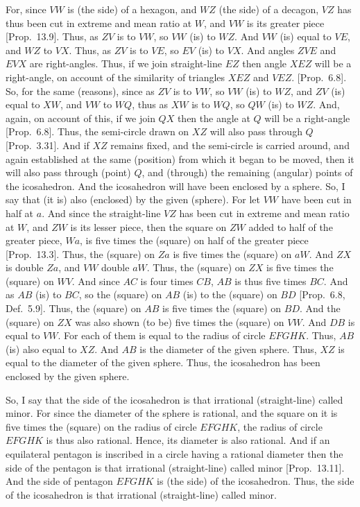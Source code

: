 For, since $VW$ is (the side) of a hexagon, and $WZ$ (the side) of
a decagon, $VZ$ has thus been cut in extreme and mean
ratio at $W$, and $VW$ is its greater piece  [Prop.~13.9]. Thus, as
$ZV$ is to $VW$, so $VW$ (is) to $WZ$. And $VW$ (is) equal
to $VE$, and $WZ$ to $VX$.  Thus, as $ZV$ is to $VE$,
so $EV$ (is) to $VX$. And angles $ZVE$ and
$EVX$ are right-angles. Thus, if we join straight-line $EZ$ then angle
$XEZ$ will be a right-angle, on account of the similarity of triangles
$XEZ$ and $VEZ$.  [Prop.~6.8]. So, for the same (reasons), since
as $ZV$ is to $VW$, so $VW$ (is) to $WZ$,  and $ZV$ (is) equal to
$XW$, and $VW$ to $WQ$, thus as $XW$ is to $WQ$, so $QW$
(is) to $WZ$. And, again, on account of this,  if we join $QX$ then the
angle at $Q$ will be a right-angle [Prop.~6.8]. Thus, the semi-circle
drawn on $XZ$ will also pass through $Q$ [Prop.~3.31]. And if $XZ$ remains
fixed, and the semi-circle is carried around, and again established at
the same (position) from which it began to be moved, then it will
also pass through (point) $Q$, and (through) the remaining (angular) points
of the icosahedron. And the icosahedron will have been enclosed by a sphere.
 So, I say that (it is) also (enclosed) by the given (sphere). 
 For let $VW$ have been cut in half at $a$. And since the straight-line $VZ$ has been cut in extreme and mean ratio at $W$, and  $ZW$ is its lesser piece,
 then the square on $ZW$ added to half of the greater piece, $Wa$, is
 five times the (square) on half of the greater piece [Prop.~13.3]. 
 Thus, the (square) on $Za$ is five times the (square) on $aW$. And
 $ZX$ is double $Za$, and $VW$ double $aW$. Thus,
 the (square) on $ZX$ is five times the (square) on $WV$. And since
 $AC$ is four times $CB$, $AB$ is thus five times $BC$. And as
 $AB$ (is) to $BC$, so the (square) on $AB$ (is) to the
 (square) on $BD$ [Prop.~6.8, Def.~5.9]. Thus, the (square)
 on $AB$ is five times the (square) on $BD$. And the (square) on 
 $ZX$ was also shown (to be) five times the (square) on $VW$. 
 And $DB$ is equal to $VW$. For each of them is equal to the
 radius of circle $EFGHK$.  Thus, $AB$ (is) also equal to
 $XZ$.  And $AB$ is the diameter of the given sphere. Thus,
 $XZ$ is equal to the diameter of the given sphere. Thus, the icosahedron
 has been enclosed by the given sphere.
 
 So, I say that the side of the icosahedron is that irrational (straight-line)
 called minor. For since the diameter of the sphere is rational, and the
 square on it is five times the (square) on the radius of circle
 $EFGHK$, the radius of circle $EFGHK$ is thus also rational.
 Hence, its diameter is also rational. And if an equilateral
 pentagon is inscribed in a circle having a rational diameter then
 the side of the pentagon is that irrational (straight-line) called minor [Prop.~13.11]. And the side of pentagon $EFGHK$ is (the side)
 of the icosahedron. Thus, the side of the icosahedron is that irrational
 (straight-line) called minor.


